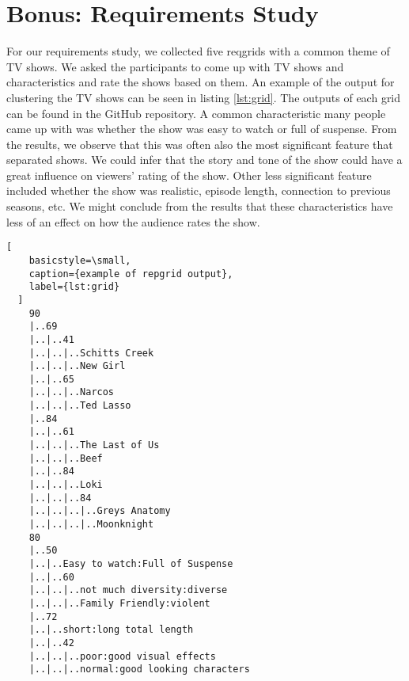 \section{Bonus: Requirements Study}
\label{sec:bonus_requirements}

For our requirements study, we collected five reqgrids with a common
theme of TV shows. We asked the participants to come up with TV shows
and characteristics and rate the shows based on them. An example of the
output for clustering the TV shows can be seen in listing
\ref{lst:grid}. The outputs of each grid can be found in the GitHub
repository. A common characteristic
many people came up with was whether the show was easy to watch or full
of suspense. From the results, we observe that this was often also the
most significant feature that separated shows. We could infer that the
story and tone of the show could have a great influence on viewers'
rating of the show. Other less significant feature included whether the
show was realistic, episode length, connection to previous seasons, etc.
We might conclude from the results that these characteristics have less
of an effect on how the audience rates the show.

\begin{minipage}{\linewidth}
  \begin{lstlisting}[
    basicstyle=\small,
    caption={example of repgrid output},
    label={lst:grid}
  ]
    90
    |..69
    |..|..41
    |..|..|..Schitts Creek
    |..|..|..New Girl
    |..|..65
    |..|..|..Narcos
    |..|..|..Ted Lasso
    |..84
    |..|..61
    |..|..|..The Last of Us
    |..|..|..Beef
    |..|..84
    |..|..|..Loki
    |..|..|..84
    |..|..|..|..Greys Anatomy
    |..|..|..|..Moonknight
    80
    |..50
    |..|..Easy to watch:Full of Suspense
    |..|..60
    |..|..|..not much diversity:diverse
    |..|..|..Family Friendly:violent
    |..72
    |..|..short:long total length
    |..|..42
    |..|..|..poor:good visual effects
    |..|..|..normal:good looking characters
  \end{lstlisting}
\end{minipage}
